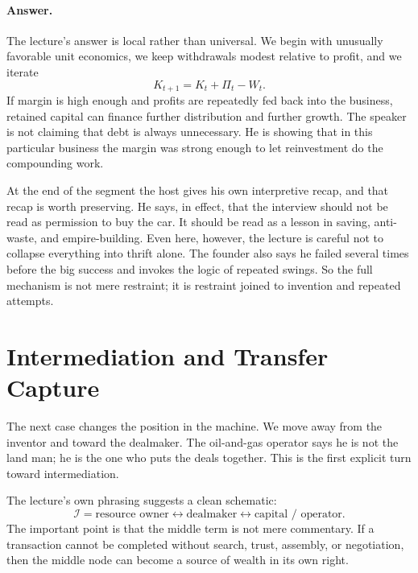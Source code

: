 \paragraph{Answer.} The lecture's answer is local rather than universal. We begin with unusually favorable unit economics, we keep withdrawals modest relative to profit, and we iterate
\[
K_{t+1}=K_t+\Pi_t-W_t.
\]
If margin is high enough and profits are repeatedly fed back into the business, retained capital can finance further distribution and further growth. The speaker is not claiming that debt is always unnecessary. He is showing that in this particular business the margin was strong enough to let reinvestment do the compounding work.

At the end of the segment the host gives his own interpretive recap, and that recap is worth preserving. He says, in effect, that the interview should not be read as permission to buy the car. It should be read as a lesson in saving, anti-waste, and empire-building. Even here, however, the lecture is careful not to collapse everything into thrift alone. The founder also says he failed several times before the big success and invokes the logic of repeated swings. So the full mechanism is not mere restraint; it is restraint joined to invention and repeated attempts.

\section{Intermediation and Transfer Capture}

The next case changes the position in the machine. We move away from the inventor and toward the dealmaker. The oil-and-gas operator says he is not the land man; he is the one who puts the deals together. This is the first explicit turn toward intermediation.

The lecture's own phrasing suggests a clean schematic:
\begin{equation}
\mathcal I
=
\text{resource owner}
\longleftrightarrow
\text{dealmaker}
\longleftrightarrow
\text{capital / operator}.
\end{equation}
The important point is that the middle term is not mere commentary. If a transaction cannot be completed without search, trust, assembly, or negotiation, then the middle node can become a source of wealth in its own right.

